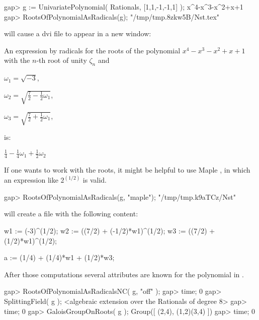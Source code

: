 \beginexample
gap> g := UnivariatePolynomial( Rationals, [1,1,-1,-1,1] );
x^4-x^3-x^2+x+1
gap> RootsOfPolynomialAsRadicals(g);
"/tmp/tmp.8zkw5B/Nst.tex"
\endexample

will cause a dvi file to appear in a new window:

An expression by radicals for the roots of the polynomial
$x^{4}-x^{3}-x^{2} + x + 1$ with the $n$-th root of unity $\zeta_n$ and

$\omega_1 = \sqrt{ - 3}$,

$\omega_2 = \sqrt{\frac{7}{2} - \frac{1}{2}\omega_1}$,

$\omega_3 = \sqrt{\frac{7}{2} + \frac{1}{2}\omega_1}$,

is:

$\frac{1}{4} - \frac{1}{4}\omega_1 + \frac{1}{2}\omega_2$

If one wants to work with the roots, it might be helpful to use Maple
\cite{Maple10}, in which an expression like $2^{(1/2)}$ is valid.

\beginexample
gap> RootsOfPolynomialAsRadicals(g, "maple");
"/tmp/tmp.k9aTCz/Nst"
\endexample

will create a file with the following content:

\beginexample
w1 := (-3)^(1/2);
w2 := ((7/2) + (-1/2)*w1)^(1/2);
w3 := ((7/2) + (1/2)*w1)^(1/2);

a := (1/4) + (1/4)*w1 + (1/2)*w3;
\endexample

After those computations several attributes are known for the
polynomial in \GAP. 

\beginexample
gap> RootsOfPolynomialAsRadicalsNC( g, "off" );
gap> time;
0
gap> SplittingField( g );
<algebraic extension over the Rationals of degree 8>
gap> time;
0
gap> GaloisGroupOnRoots( g );
Group([ (2,4), (1,2)(3,4) ])
gap> time;
0
\endexample






